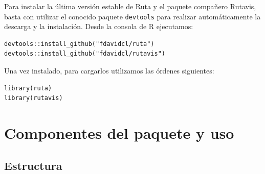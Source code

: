 Para instalar la última versión estable de Ruta y el paquete compañero Rutavis, basta con utilizar el conocido paquete \texttt{devtools} \autocite{devtools} para realizar automáticamente la descarga y la instalación. Desde la consola de R ejecutamos:
\begin{lstlisting}[numbers=none]
devtools::install_github("fdavidcl/ruta")
devtools::install_github("fdavidcl/rutavis")
\end{lstlisting}

Una vez instalado, para cargarlos utilizamos las órdenes siguientes:
\begin{lstlisting}[numbers=none]
library(ruta)
library(rutavis)
\end{lstlisting}


\section{Componentes del paquete y uso}\label{componentes-del-paquete}

\subsection{Estructura}

